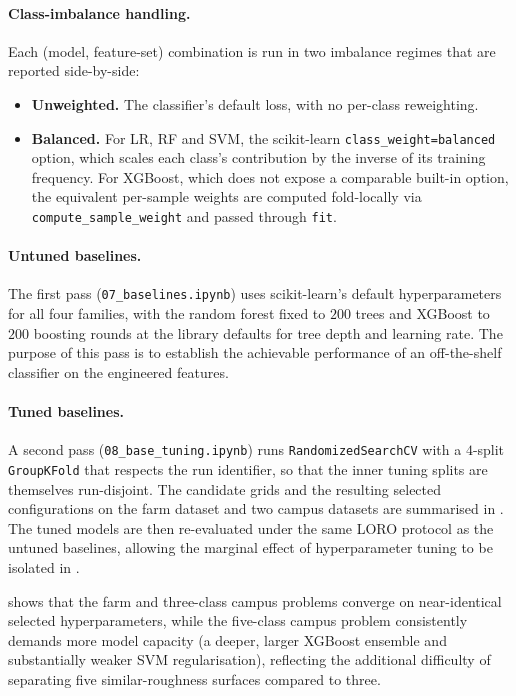 \paragraph{Class-imbalance handling.}
Each (model, feature-set) combination is run in two imbalance regimes that are reported side-by-side:
\begin{itemize}
    \item \textbf{Unweighted.} The classifier's default loss, with no per-class reweighting.
    \item \textbf{Balanced.} For LR, RF and SVM, the scikit-learn \texttt{class\_weight=\textquotesingle balanced\textquotesingle} option, which scales each class's contribution by the inverse of its training frequency. For XGBoost, which does not expose a comparable built-in option, the equivalent per-sample weights are computed fold-locally via \texttt{compute\_sample\_weight} and passed through \texttt{fit}.
\end{itemize}

\paragraph{Untuned baselines.}
The first pass (\texttt{07\_baselines.ipynb}) uses scikit-learn's default hyperparameters for all four families, with the random forest fixed to $200$ trees and XGBoost to $200$ boosting rounds at the library defaults for tree depth and learning rate. The purpose of this pass is to establish the achievable performance of an off-the-shelf classifier on the
engineered features.

\paragraph{Tuned baselines.}
A second pass (\texttt{08\_base\_tuning.ipynb}) runs \texttt{RandomizedSearchCV} with a $4$-split \texttt{GroupKFold} that respects the run identifier, so that the inner tuning splits are themselves run-disjoint. The candidate grids and the resulting selected configurations on the farm dataset and two campus datasets are summarised in . The tuned models are then re-evaluated under the same LORO protocol as the untuned baselines, allowing the marginal effect of hyperparameter tuning to be isolated in .

 shows that the farm and three-class campus problems converge on near-identical selected hyperparameters, while the five-class campus problem consistently demands more model capacity (a deeper, larger XGBoost ensemble and substantially weaker SVM regularisation), reflecting the additional difficulty of separating five similar-roughness surfaces compared to three.

